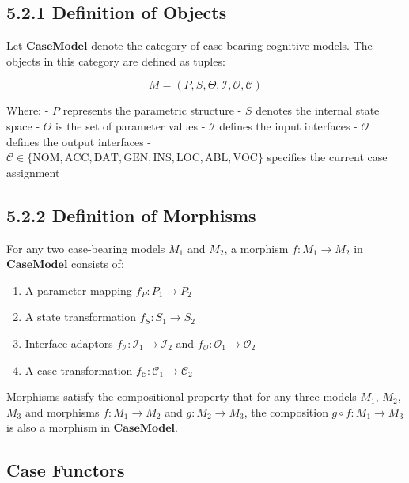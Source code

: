 \documentclass[
  11pt,
  letterpaper,
]{article}
\providecommand{\tightlist}{%
  \setlength{\itemsep}{0pt}\setlength{\parskip}{0pt}}
\begin{document}
\hypertarget{definition-of-objects}{%
\subsection{5.2.1 Definition of Objects}\label{definition-of-objects}}

Let \(\mathbf{CaseModel}\) denote the category of case-bearing cognitive
models. The objects in this category are defined as tuples:

\[M = (P, S, \Theta, \mathcal{I}, \mathcal{O}, \mathcal{C})\]

Where: - \(P\) represents the parametric structure - \(S\) denotes the
internal state space - \(\Theta\) is the set of parameter values -
\(\mathcal{I}\) defines the input interfaces - \(\mathcal{O}\) defines
the output interfaces -
\(\mathcal{C} \in \{\text{NOM}, \text{ACC}, \text{DAT}, \text{GEN}, \text{INS}, \text{LOC}, \text{ABL}, \text{VOC}\}\)
specifies the current case assignment

\hypertarget{definition-of-morphisms}{%
\subsection{5.2.2 Definition of
Morphisms}\label{definition-of-morphisms}}

For any two case-bearing models \(M_1\) and \(M_2\), a morphism
\(f: M_1 \rightarrow M_2\) in \(\mathbf{CaseModel}\) consists of:

\begin{enumerate}
\def\labelenumi{\arabic{enumi}.}
\tightlist
\item
  A parameter mapping \(f_P: P_1 \rightarrow P_2\)
\item
  A state transformation \(f_S: S_1 \rightarrow S_2\)
\item
  Interface adaptors
  \(f_{\mathcal{I}}: \mathcal{I}_1 \rightarrow \mathcal{I}_2\) and
  \(f_{\mathcal{O}}: \mathcal{O}_1 \rightarrow \mathcal{O}_2\)
\item
  A case transformation
  \(f_{\mathcal{C}}: \mathcal{C}_1 \rightarrow \mathcal{C}_2\)
\end{enumerate}

Morphisms satisfy the compositional property that for any three models
\(M_1\), \(M_2\), \(M_3\) and morphisms \(f: M_1 \rightarrow M_2\) and
\(g: M_2 \rightarrow M_3\), the composition
\(g \circ f: M_1 \rightarrow M_3\) is also a morphism in
\(\mathbf{CaseModel}\).

\hypertarget{case-functors}{%
\subsection{Case Functors}\label{case-functors}}
\end{document}
